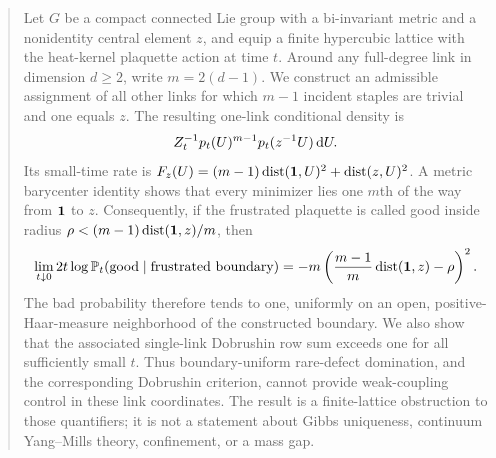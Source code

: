 \begin{abstract}
Let $G$ be a compact connected Lie group with a bi-invariant metric and a
nonidentity central element $z$, and equip a finite hypercubic lattice with
the heat-kernel plaquette action at time $t$.  Around any full-degree link in
dimension $d\geq2$, write $m=2(d-1)$.  We construct an admissible assignment
of all other links for which $m-1$ incident staples are trivial and one equals
$z$.  The resulting one-link conditional density is
\[
  Z_t^{-1}p_t(U)^{m-1}p_t(z^{-1}U)\,\Haar .
\]
Its small-time rate is
$F_z(U)=(m-1)\dist(\one,U)^2+\dist(z,U)^2$.  A metric barycenter identity
shows that every minimizer lies one $m$th of the way from $\one$ to $z$.
Consequently, if the frustrated plaquette is called good inside radius
$\rho<(m-1)\dist(\one,z)/m$, then
\[
 \lim_{t\downarrow0}2t\log\Prob_t(\text{good}\mid\text{frustrated boundary})
 =-m\left(\frac{m-1}{m}\dist(\one,z)-\rho\right)^2.
\]
The bad probability therefore tends to one, uniformly on an open,
positive-Haar-measure neighborhood of the constructed boundary.  We also
show that the associated single-link Dobrushin row sum exceeds one for all
sufficiently small $t$.  Thus boundary-uniform rare-defect domination, and
the corresponding Dobrushin criterion, cannot provide weak-coupling control
in these link coordinates.  The result is a finite-lattice obstruction to
those quantifiers; it is not a statement about Gibbs uniqueness, continuum
Yang--Mills theory, confinement, or a mass gap.
\end{abstract}
